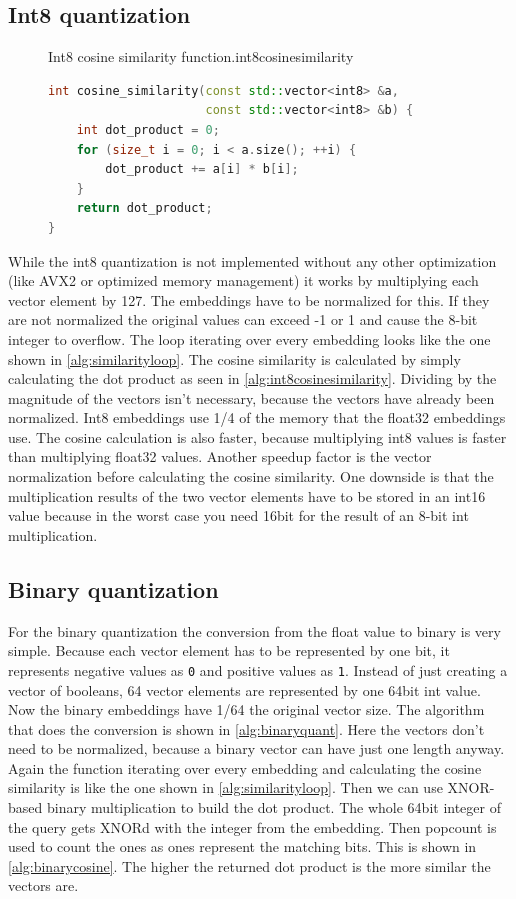 \subsection{Int8 quantization}
\label{int8quant}
\begin{figure}[h]
    \begin{algorithm}{Int8 cosine similarity function.}{int8cosinesimilarity}
        \begin{lstlisting}[language=C++]
int cosine_similarity(const std::vector<int8> &a,
                      const std::vector<int8> &b) {
    int dot_product = 0;
    for (size_t i = 0; i < a.size(); ++i) {
        dot_product += a[i] * b[i];
    }
    return dot_product;
}
    \end{lstlisting}
    \end{algorithm}
\end{figure}
While the int8 quantization is not implemented without any other optimization (like AVX2 or optimized memory management) it works by multiplying each vector element by 127. The embeddings have to be normalized for this. If they are not normalized the original values can exceed -1 or 1 and cause the 8-bit integer to overflow. The loop iterating over every embedding looks like the one shown in \autoref{alg:similarityloop}. The cosine similarity is calculated by simply calculating the dot product as seen in \autoref{alg:int8cosinesimilarity}. Dividing by the magnitude of the vectors isn't necessary, because the vectors have already been normalized. Int8 embeddings use 1/4 of the memory that the float32 embeddings use. The cosine calculation is also faster, because multiplying int8 values is faster than multiplying float32 values. Another speedup factor is the vector normalization before calculating the cosine similarity. One downside is that the multiplication results of the two vector elements have to be stored in an int16 value because in the worst case you need 16bit for the result of an 8-bit int multiplication.

\subsection{Binary quantization}
\label{binaryquant}
For the binary quantization the conversion from the float value to binary is very simple. Because each vector element has to be represented by one bit, it represents negative values as \texttt{0} and positive values as \texttt{1}. Instead of just creating a vector of booleans, 64 vector elements are represented by one 64bit int value. Now the binary embeddings have 1/64 the original vector size. The algorithm that does the conversion is shown in \autoref{alg:binaryquant}. Here the vectors don't need to be normalized, because a binary vector can have just one length anyway.
Again the function iterating over every embedding and calculating the cosine similarity is like the one shown in \autoref{alg:similarityloop}.
Then we can use XNOR-based binary multiplication to build the dot product. The whole 64bit integer of the query gets XNORd with the integer from the embedding. Then popcount is used to count the ones as ones represent the matching bits. This is shown in \autoref{alg:binarycosine}. The higher the returned dot product is the more similar the vectors are.

